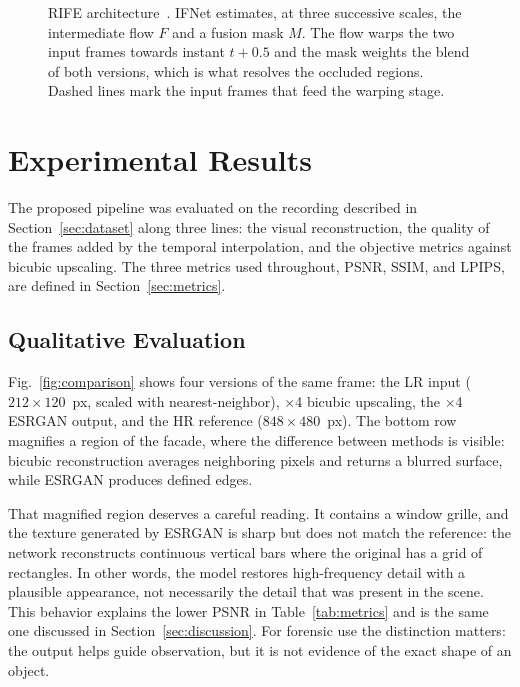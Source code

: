 \documentclass[conference]{IEEEtran}
\begin{document}
\begin{figure}[t]
    \centering
    
    \caption{RIFE architecture~\cite{huang2022rife}. IFNet estimates, at three successive scales, the intermediate flow $F$ and a fusion mask $M$. The flow warps the two input frames towards instant $t\!+\!0.5$ and the mask weights the blend of both versions, which is what resolves the occluded regions. Dashed lines mark the input frames that feed the warping stage.}
    \label{fig:rife}
\end{figure}

\section{Experimental Results}

The proposed pipeline was evaluated on the recording described in Section~\ref{sec:dataset} along three lines: the visual reconstruction, the quality of the frames added by the temporal interpolation, and the objective metrics against bicubic upscaling. The three metrics used throughout, PSNR, SSIM, and LPIPS, are defined in Section~\ref{sec:metrics}.

\subsection{Qualitative Evaluation}

Fig.~\ref{fig:comparison} shows four versions of the same frame: the LR input ($212\times120$~px, scaled with nearest-neighbor), $\times$4 bicubic upscaling, the $\times$4 ESRGAN output, and the HR reference ($848\times480$~px). The bottom row magnifies a region of the facade, where the difference between methods is visible: bicubic reconstruction averages neighboring pixels and returns a blurred surface, while ESRGAN produces defined edges.

That magnified region deserves a careful reading. It contains a window grille, and the texture generated by ESRGAN is sharp but does not match the reference: the network reconstructs continuous vertical bars where the original has a grid of rectangles. In other words, the model restores high-frequency detail with a plausible appearance, not necessarily the detail that was present in the scene. This behavior explains the lower PSNR in Table~\ref{tab:metrics} and is the same one discussed in Section~\ref{sec:discussion}. For forensic use the distinction matters: the output helps guide observation, but it is not evidence of the exact shape of an object.
\end{document}
